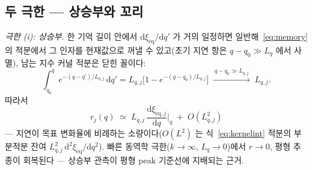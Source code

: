 \documentclass[11pt,a4paper]{article}
\newcommand{\dd}{\mathrm{d}}
\newcommand{\eq}{\mathrm{eq}}
\begin{document}
\subsection{두 극한 — 상승부와 꼬리}
\emph{극한 (i): 상승부.} 한 기억 길이 안에서 $\dd\xi_{\eq}/\dd q'$ 가 거의 일정하면 일반해~\eqref{eq:memory} 의 적분에서 그 인자를 현재값으로 꺼낼 수 있고(초기 지연 항은 $q-q_0\gg L_q$ 에서 사멸), 남는 지수 커널 적분은 닫힌 꼴이다:
\begin{equation}
\int_{q_0}^{q}e^{-(q-q')/L_{q,j}}\,\dd q'
=L_{q,j}\Big[1-e^{-(q-q_0)/L_{q,j}}\Big]
\;\xrightarrow{\ q-q_0\gg L_{q,j}\ }\;L_{q,j}.
\label{eq:kernelint}
\end{equation}
따라서
\begin{equation}
r_j(q)\;\simeq\;L_{q,j}\,\frac{\dd\xi_{\eq,j}}{\dd q}\bigg|_{q}\;+\;O(L_{q,j}^2)
\label{eq:risefollow}
\end{equation}
— 지연이 목표 변화율에 비례하는 소량이다($O(L^2)$ 는 식~\eqref{eq:kernelint} 적분의 부분적분 잔여 $L_{q,j}^2\,\dd^2\xi_{\eq}/\dd q^2$). 빠른 동역학 극한($k\to\infty$, $L_q\to0$)에서 $r\to0$, 평형 추종이 회복된다 — 상승부 관측이 평형 peak 기준선에 지배되는 근거.
\end{document}

